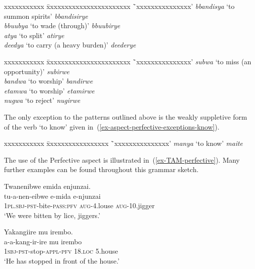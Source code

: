 \ea
\label{ex-aspect-imbrication-glide-By}
\begin{tabbing}
xxxxxxxxxxx \= xxxxxxxxxxxxxxxxxxxxxxx \=`xxxxxxxxxxxxxxx'\kill
\textit{bbandisya} \>`to summon spirits' \> \textit{bbandisirye}\\
\textit{bbuubya} \>`to wade (through)' \> \textit{bbuubirye}\\
\textit{atya} \>`to split' \> \textit{atirye}\\
\textit{deedya} \>`to carry (a heavy burden)' \> \textit{deederye}
\end{tabbing}
\z

\ea
\label{ex-aspect-imbrication-glide-Bw}
\begin{tabbing}
xxxxxxxxxxx \= xxxxxxxxxxxxxxxxxxxxxxx \=`xxxxxxxxxxxxxxx'\kill
\textit{subwa} \>`to miss (an opportunity)' \> \textit{subirwe}\\
\textit{bandwa} \>`to worship' \> \textit{bandirwe}\\
\textit{etamwa} \>`to worship' \> \textit{etamirwe}\\
\textit{nugwa} \>`to reject' \> \textit{nugirwe}
\end{tabbing}
\z

The only exception to the patterns outlined above is the weakly suppletive form of the verb `to know' given in~(\ref{ex-aspect-perfective-exceptions-know}).

\ea \label{ex-aspect-perfective-exceptions-know}
\begin{tabbing}
xxxxxxxxxxx \= xxxxxxxxxxxxxxxxx \=`xxxxxxxxxxxxxxx'\kill
\textit{manya}	\> `to know'\> \textit{maite}
\end{tabbing}
\z

The use of the Perfective aspect is illustrated in~(\ref{ex-TAM-perfective}). Many further examples can be found throughout this grammar sketch.
\ea \label{ex-TAM-perfective}
\begin{xlist}
\ex	
	\glll Twanenibwe emida enjunzai.\\
	  tu-a-nen-eibwe e-mida e-njunzai\\
		1\textsc{pl.sbj}-\textsc{pst}-bite-\textsc{pass}:\textsc{pfv} \textsc{aug}-4.louse \textsc{aug}-10.jigger\\
	\glt ‘We were bitten by lice, jiggers.’ 

\ex 		\glll Yakangiire mu irembo.\\
	a-a-kang-ir-ire	mu	irembo\\
		\textsc{1sbj}-\textsc{pst}-stop-\textsc{appl}-\textsc{pfv} 18.\textsc{loc} 5.house\\
\glt ‘He has stopped in front of the house.' 
\end{xlist}
\z


